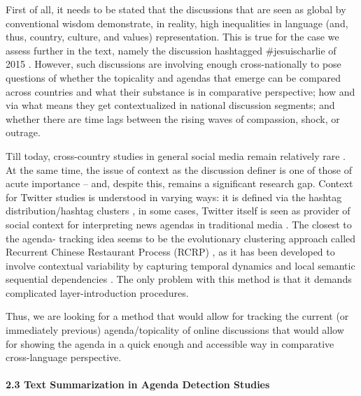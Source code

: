 First of all, it needs to be stated that the discussions that are seen as global by conventional wisdom demonstrate, in reality, high inequalities in language (and, thus, country, culture, and values) representation. This is true for the case we assess further in the text, namely the discussion hashtagged \#jesuischarlie of 2015 \cite{BodrunovaSmoliarovaBlekanov}. However, such discussions are involving enough cross-nationally to pose questions of whether the topicality and agendas that emerge can be compared across countries and what their substance is in comparative perspective; how and via what means they get contextualized in national discussion segments; and whether there are time lags between the rising waves of compassion, shock, or outrage.

Till today, cross-country studies in general social media remain relatively rare \cite{BodrunovaBlekanovSmoliarova}. At the same time, the issue of context as the discussion definer is one of those of acute importance \cite{Bodrunova,Bodrunova2020} -- and, despite this, remains a significant research gap. Context for Twitter studies is understood in varying ways: it is defined via the hashtag distribution/hashtag clusters \cite{AlamRyuLee}, in some cases, Twitter itself is seen as provider of social context for interpreting news agendas in traditional media \cite{KalyanamMantrachSaezTrumper}. The closest to the agenda- tracking idea seems to be the evolutionary clustering approach called Recurrent Chinese Restaurant Process (RCRP) \cite{AhmedXing}, as it has been developed to involve contextual variability by capturing temporal dynamics and local semantic sequential dependencies \cite{LuTanLi}. The only problem with this method is that it demands complicated layer-introduction procedures.

Thus, we are looking for a method that would allow for tracking the current (or immediately previous) agenda/topicality of online discussions that would allow for showing the agenda in a quick enough and accessible way in comparative cross-language perspective.

\paragraph{2.3 Text Summarization in Agenda Detection Studies}

